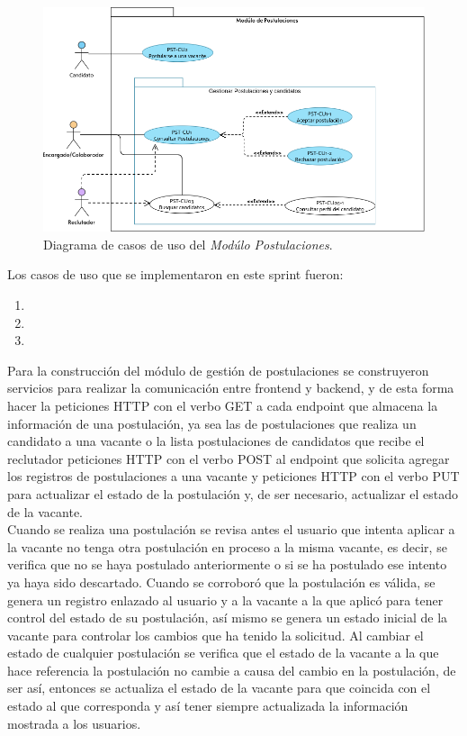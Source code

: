 \begin{figure}[H]
    \begin{center}
        \includegraphics[width=.7\textwidth]{sprints/imagenes/DCUPST.png}
    \end{center}
    \caption{Diagrama de casos de uso del \textit{Modúlo Postulaciones}.}
    \label{dcu:DCUPST}
\end{figure}

Los casos de uso que se implementaron en este sprint fueron:
\begin{enumerate}
    \item {}
    \item {}
    \item {}
\end{enumerate} 



Para la construcción del módulo de gestión de postulaciones se construyeron servicios para realizar la comunicación entre frontend y backend, y de esta forma hacer la peticiones HTTP con el verbo GET a cada endpoint que almacena la información de una postulación, ya sea las de postulaciones que realiza un candidato a una vacante o la lista postulaciones de candidatos que recibe el reclutador peticiones HTTP con el verbo POST al endpoint que solicita agregar los registros de postulaciones a una vacante y peticiones HTTP con el verbo PUT para actualizar el estado de la postulación y, de ser necesario, actualizar el estado de la vacante.\\
\newline
Cuando se realiza una postulación se revisa antes el usuario que intenta aplicar a la vacante no tenga otra postulación en proceso a la misma vacante, es decir, se verifica que no se haya postulado anteriormente o si se ha postulado ese intento ya haya sido descartado. Cuando se corroboró que la postulación es válida, se genera un registro enlazado al usuario y a la vacante a la que aplicó para tener control del estado de su postulación, así mismo se genera un estado inicial de la vacante para controlar los cambios que ha tenido la solicitud. Al cambiar el estado de cualquier postulación se verifica que el estado de la  vacante a la que hace referencia la postulación no cambie a causa del cambio en la postulación, de ser así, entonces se actualiza el estado de la vacante para que coincida con el estado al que corresponda y así tener siempre actualizada la información mostrada a los usuarios.
